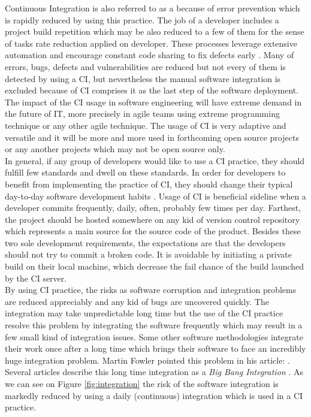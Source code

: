 Continuous Integration is also referred to as a  \cite{CIcure} because of error prevention which is rapidly reduced by using this practice. The job of a developer includes a project build repetition which may be also reduced to a few of them for the sense of tasks rate reduction applied on developer. These processes leverage extensive automation and encourage constant code sharing to fix defects early \cite{DigitalOceanCI}. Many of errors, bugs, defects and vulnerabilities are reduced but not every of them is detected by using a CI, but nevertheless the manual software integration is excluded because of CI comprises it as the last step of the software deployment. The impact of the CI usage in software engineering will have extreme demand in the future of IT, more precisely in agile teams using extreme programming technique or any other agile technique. The usage of CI is very adaptive and versatile and it will be more and more used in forthcoming open source projects or any another projects which may not be open source only.\\

In general, if any group of developers would like to use a CI practice, they should fulfill few standards and dwell on these standards. In order for developers to benefit from implementing the practice of CI, they should change their typical day-to-day software development habits \cite{CIQualityFramework}. Usage of CI is beneficial sideline when a developer commits frequently, daily, often, probably few times per day. Farthest, the project should be hosted somewhere on any kid of version control repository which represents a main source for the source code of the product. Besides these two sole development requirements, the expectations are that the developers should not try to commit a broken code. It is avoidable by initiating a private build on their local machine, which decrease the fail chance of the build launched by the CI server.\\

By using CI practice, the risks as software corruption and integration problems are reduced appreciably and any kid of bugs are uncovered quickly. The integration may take unpredictable long time but the use of the CI practice resolve this problem by integrating the software frequently which may result in a few small kind of integration issues. Some other software methodologies integrate their work once after a long time which brings their software to face an incredibly huge integration problem. Martin Fowler pointed this problem in his article:  \cite{MartinFowler}. Several articles describe this long time integration as a \textit{Big Bang Integration} \cite{AaltoUniversity}. As we can see on Figure \ref{fig:integration} the risk of the software integration is markedly reduced by using a daily (continuous) integration which is used in a CI practice.

